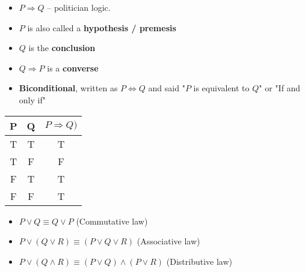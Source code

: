 \documentclass[english,10pt,a4paper]{article}
\begin{document}
\begin{theo}

\begin{minipage}{0.6\linewidth} 
\begin{itemize}
\item $P \Rightarrow Q$ -- politician logic.
\item $P$ is also called a \textbf{hypothesis / premesis}
\item $Q$ is the \textbf{conclusion}
\item $Q \Rightarrow P$ is a \textbf{converse}
\item \textbf{Biconditional}, written as $P \Leftrightarrow Q$ and said "$P$ is equivalent to $Q$" or "If and only if"
\end{itemize}
\end{minipage}
\hspace{0.1cm}
\begin{minipage}{0.3\linewidth}

\begin{tabular}{cc|c}
P & Q & $P \Rightarrow Q)$\\ 
\hline
T & T & T \\ 
T & F & F \\
F & T & T \\
F & F & T
\end{tabular} 
\end{minipage}
\end{theo}

\begin{theo} 
\begin{itemize}
\item $ P \vee Q \equiv Q \vee P$ (Commutative law)
\item $P \vee (Q \vee R) \equiv (P \vee Q \vee R)$ (Associative law)
\item $P\vee (Q \wedge R) \equiv (P \vee Q) \wedge (P \vee R) $ (Distributive law)
\end{itemize}
\end{theo}
\end{document}
